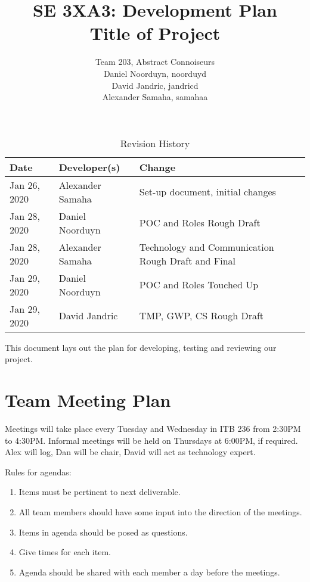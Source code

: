 \documentclass{article}
\title{SE 3XA3: Development Plan\\Title of Project}
\author{Team 203, Abstract Connoiseurs\\
Daniel Noorduyn, noorduyd\\
David Jandric, jandricd\\
Alexander Samaha, samahaa\\
}
\date{}
\begin{document}
\begin{table}[hp]
\caption{Revision History} \label{TblRevisionHistory}
\begin{tabularx}{\textwidth}{llX}
\toprule
\textbf{Date} & \textbf{Developer(s)} & \textbf{Change}\\
\midrule
Jan 26, 2020 & Alexander Samaha & Set-up document, initial changes\\
Jan 28, 2020 & Daniel Noorduyn & POC and Roles Rough Draft\\
Jan 28, 2020 & Alexander Samaha & Technology and Communication Rough Draft and Final\\
Jan 29, 2020 & Daniel Noorduyn & POC and Roles Touched Up\\
Jan 29, 2020 & David Jandric & TMP, GWP, CS Rough Draft\\
\bottomrule
\end{tabularx}
\end{table}

\newpage

\maketitle

This document lays out the plan for developing, testing and reviewing our
project.

\section{Team Meeting Plan}

Meetings will take place every Tuesday and Wednesday in ITB 236 from 2:30PM to
4:30PM. Informal meetings will be held on Thursdays at 6:00PM, if required.
Alex will log, Dan will be chair, David will act as technology expert.

Rules for agendas:
\begin{enumerate}
    \item Items must be pertinent to next deliverable.
    \item All team members should have some input into the direction of the meetings.
    \item Items in agenda should be posed as questions.
    \item Give times for each item.
    \item Agenda should be shared with each member a day before the meetings.
\end{enumerate}
\end{document}
